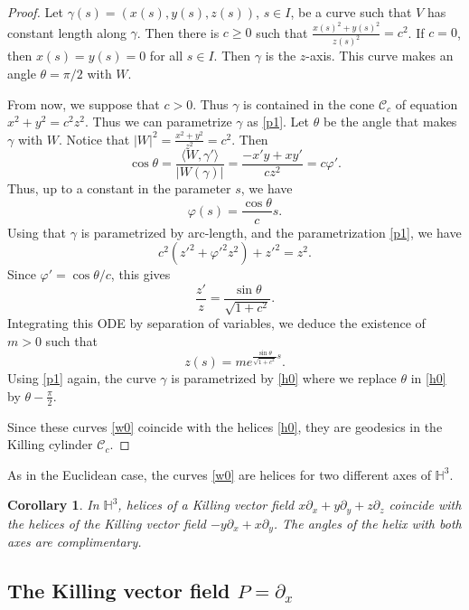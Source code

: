 \documentclass[a4paper,12pt]{amsart}
\newtheorem{corollary}[theorem]{Corollary}
\theoremstyle{definition}
\def\h{\mathbb H}
\begin{document}
 \begin{proof}  
  Let $\gamma(s)=(x(s),y(s),z(s))$, $s\in I$, be a curve such that $V$ has  constant length along $\gamma$. Then there is $c\geq 0$ such that
  $\frac{x(s)^2+y(s)^2}{z(s)^2}=c^2$. If $c=0$, then $x(s)=y(s)=0$ for all $s\in I$. Then $\gamma$ is the $z$-axis. This curve makes an angle $\theta=\pi/2$ with $W$. 
  
  From now, we suppose that $c>0$. Thus $\gamma$ is contained in the cone $\mathcal{C}_c$ of equation  $x^2+y^2=c^2z^2$. Thus we can parametrize $\gamma$ as \eqref{p1}. Let $\theta$ be the angle that makes $\gamma$ with $W$. Notice that $|W|^2=\frac{x^2+y^2}{z^2}=c^2$. Then 
  $$\cos\theta=\frac{\langle W,\gamma'\rangle}{|W(\gamma)|}=\frac{-x'y+xy'}{cz^2}=c\varphi'.$$
  Thus, up to a constant in the parameter $s$, we have
  $$\varphi(s)=\frac{\cos\theta}{c}s.$$
  Using that $\gamma$ is parametrized by arc-length, and the parametrization \eqref{p1}, we have 
  $$c^2(z'^2+\varphi'^2 z^2)+z'^2=z^2.$$
  Since $\varphi'=\cos\theta/c$, this gives
  $$\frac{z'}{z}=\frac{\sin\theta}{\sqrt{1+c^2}}.$$
  Integrating this ODE by separation of variables, we deduce the existence of $m>0$ such that  
  $$z(s)=m e^{\frac{\sin\theta}{\sqrt{1+c^2}}s}.$$
  Using \eqref{p1} again,  the curve $\gamma$ is parametrized by \eqref{h0} where we replace $\theta$ in \eqref{h0} by $\theta-\frac{\pi}{2}$.
  
  Since these curves \eqref{w0} coincide with the helices \eqref{h0},  they are geodesics in the Killing cylinder  $\mathcal{C}_c$.
  \end{proof}
  

  
   

 As in the Euclidean case, the curves \eqref{w0} are helices for two different axes  of $\h^3$.
 
 \begin{corollary} In $\h^3$,   helices of a Killing vector field $x\partial_x+y\partial_y+z\partial_z$   coincide with the   helices of the Killing vector field $-y\partial_x+x\partial_y$. The angles of the helix with both axes are complimentary. 
  \end{corollary}
 
  \subsection{The Killing vector field $P= \partial_x$}
  
  
 
\end{document}
